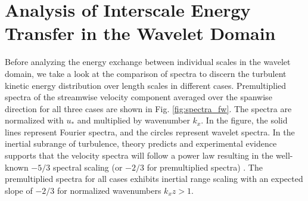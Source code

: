\section{Analysis of Interscale Energy Transfer in the Wavelet Domain}
\label{Analysis of inter-scale energy transfer in wavelet domain} 

Before analyzing the energy exchange between individual scales in the wavelet domain, we take a look at the comparison of spectra to discern the turbulent kinetic energy distribution over length scales in different cases.  Premultiplied spectra of the streamwise velocity component averaged over the spanwise direction for all three cases are shown in Fig. \ref{fig:spectra_fw}.  The spectra are normalized with $u_*$ and multiplied by wavenumber $k_{x}$. In the figure, the solid lines represent Fourier spectra, and the circles represent wavelet spectra. In the inertial subrange of turbulence, theory predicts and experimental evidence supports that the velocity spectra will follow a power law resulting in the well-known $-5/3$ spectral scaling (or $-2/3$ for premultiplied spectra) \citep{perry_chng_jfm_86}. The premultiplied spectra for all cases exhibits inertial range scaling with an expected slope of $-2/3$ for normalized wavenumbers $k_xz > 1$. 
